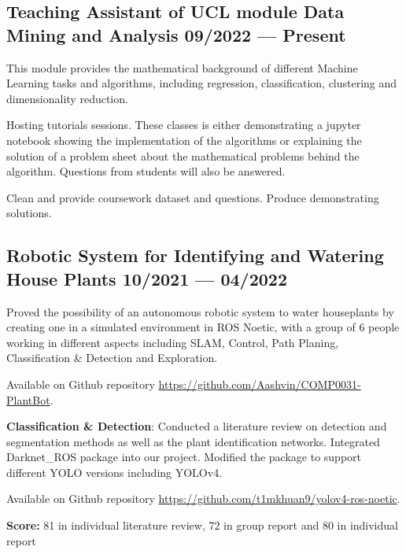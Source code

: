 \subsection{
    Teaching Assistant of UCL module Data Mining and Analysis
    \hfill 09/2022 --- Present
}
    \begin{zitemize}
        \item   This module provides the mathematical background of different Machine 
                Learning tasks and algorithms, including regression, classification, 
                clustering and dimensionality reduction.
        \item   Hosting tutorials sessions. These classes is either demonstrating a jupyter
                notebook showing the implementation of the algorithms or explaining the solution of 
                a problem sheet about the mathematical problems behind the algorithm. Questions 
                from students will also be answered. 
        \item   Clean and provide coursework dataset and questions. 
                Produce demonstrating solutions.
    \end{zitemize}

\subsection{
    Robotic System for Identifying and Watering House Plants 
    \hfill 10/2021 --- 04/2022
}
    \begin{zitemize}
        \item   Proved the possibility of an autonomous robotic system to water houseplants
                by creating one in a simulated environment in ROS Noetic, 
                with a group of 6 people working in different aspects including
                SLAM, Control, Path Planing, Classification \& Detection and Exploration.
        \item   Available on Github repository
                \url{https://github.com/Aashvin/COMP0031-PlantBot}.
        \item   \textbf{Classification \& Detection}: 
                Conducted a literature review on detection and 
                segmentation methods as well as the plant identification networks.
                Integrated Darknet\_ROS package into our project.
                Modified the package to support different YOLO versions including YOLOv4.
        \item   Available on Github repository
                \url{https://github.com/t1mkhuan9/yolov4-ros-noetic}.
        \item   \textbf{Score:}
                81 in individual literature review, 72 in group report and 80 in individual report
    \end{zitemize}


